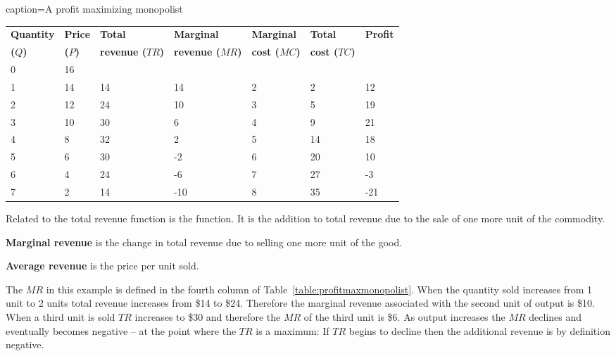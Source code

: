 \begin{Table}{caption={A profit maximizing monopolist \label{table:profitmaxmonopolist}}}
\begin{tabu} to \linewidth {|X[0.7,c]X[0.7,c]X[1.15,c]X[1.15,c]X[1,c]X[1,c]X[0.7,c]|} \hline 
		\textbf{Quantity} & \textbf{Price} & \textbf{Total} & \textbf{Marginal} & \textbf{Marginal} & \textbf{Total} & \textbf{Profit} \\[-0.1em]
		\textbf{($Q$)}	&	\textbf{($P$)}	&	\textbf{revenue ($TR$)}	&	\textbf{revenue ($MR$)}	&	\textbf{cost ($MC$)}	&	\textbf{cost ($TC$)}	&	\\  & 16 &  &  &  &  &  \\
		1 & 14 & 14 & 14 & 2 & 2 & 12 \\ 
	2 & 12 & 24 & 10 & 3 & 5 & 19 \\
		3 & 10 & 30 & 6 & 4 & 9 & 21 \\ 
	4 & 8 & 32 & 2 & 5 & 14 & 18 \\ 
		5 & 6 & 30 & -2 & 6 & 20 & 10 \\ 
	6 & 4 & 24 & -6 & 7 & 27 & -3 \\
		7 & 2 & 14 & -10 & 8 & 35 & -21 \\ \hline 
\end{tabu}
\end{Table}

\newhtmlpage



\newhtmlpage

Related to the total revenue function is the 
function. It is the addition to total revenue due to the sale of one more
unit of the commodity.

\begin{DefBox}
	\textbf{Marginal revenue} is the change in total revenue due to selling one more unit of the good. 
	
	\textbf{Average revenue} is the price per unit sold.
\end{DefBox}

The $MR$ in this example is defined in the fourth column of Table~\ref{table:profitmaxmonopolist}.
When the quantity sold increases from 1 unit to
2 units total revenue increases from \$14 to \$24. Therefore the marginal
revenue associated with the second unit of output is \$10. When a third unit
is sold $TR$ increases to \$30 and therefore the $MR$ of the third unit is
\$6. As output increases the $MR$ declines and eventually becomes negative
-- at the point where the $TR$ is a maximum: If $TR$ begins to decline then
the additional revenue is by definition negative.

